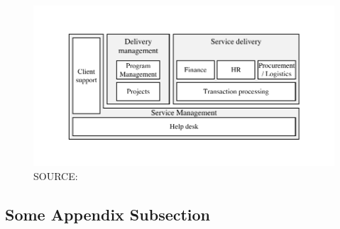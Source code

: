		\begin{figure}[caption={Outsourcing provider processes}, label={fig:scheweproc}]
	{	\includegraphics[width=.8\textwidth]{figures/scheweproc.pdf}}
		\hspace{6.2cm}	SOURCE: \citep[]{schewe2007}
\end{figure}

\subsection{Some Appendix Subsection}

\lipsum[10]